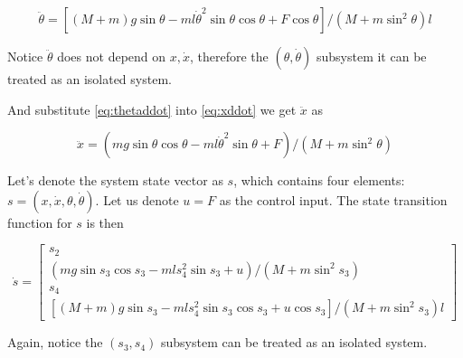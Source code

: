 \documentclass[]{article}
\begin{document}
\begin{equation}\label{eq:thetaddot}
	\ddot{\theta} = [(M+m)g\sin\theta - ml\dot{\theta}^2\sin\theta\cos\theta + F\cos\theta]/(M+m\sin^2\theta)l
\end{equation}

Notice $\ddot{\theta}$ does not depend on $x,\dot{x}$, therefore the $(\theta,\dot{\theta})$ subsystem it can be treated as an isolated system.

And substitute \eqref{eq:thetaddot} into \eqref{eq:xddot} we get $\ddot{x}$ as

\begin{equation}
	\ddot{x} = (mg\sin\theta\cos\theta-ml\dot{\theta}^2\sin\theta + F)/(M+m\sin^2\theta)
\end{equation}

Let's denote the system state vector as $s$, which contains four elements: $s=(x,\dot{x},\theta,\dot{\theta})$. Let us denote $u=F$ as the control input. The state transition function for $s$ is then

\begin{equation}
	\dot{s}=\begin{bmatrix}
	s_2\\
	(mg\sin s_3\cos s_3-ml s_4^2\sin s_3 + u)/(M+m\sin^2 s_3)\\
	s_4\\
	[(M+m)g\sin s_3 - ml s_4^2\sin s_3\cos s_3 + u\cos s_3]/(M+m\sin^2 s_3)l
	\end{bmatrix}
\end{equation}

Again, notice the $(s_3,s_4)$ subsystem can be treated as an isolated system.
\end{document}

